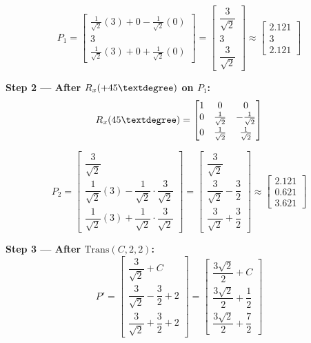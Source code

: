 \documentclass[12pt,a3paper]{article}
\begin{document}
\begin{enumerate}
\begin{tcolorbox}[enhanced,breakable,ansbox,colback=cD!4,colframe=cD,
  boxrule=0.8pt,arc=5pt,
  title={\textbf{Answer}},fonttitle=\bfseries\color{white},colbacktitle=cD]
\[
  P_1 = \begin{bmatrix}
    \frac{1}{\sqrt{2}}(3) + 0 - \frac{1}{\sqrt{2}}(0)\\[4pt]
    3\\[4pt]
    \frac{1}{\sqrt{2}}(3) + 0 + \frac{1}{\sqrt{2}}(0)
  \end{bmatrix}
  = \begin{bmatrix}
    \dfrac{3}{\sqrt{2}}\\[8pt]
    3\\[8pt]
    \dfrac{3}{\sqrt{2}}
  \end{bmatrix}
  \approx \begin{bmatrix}2.121\\3\\2.121\end{bmatrix}
\]

\textbf{Step 2 — After $R_x(+45\textdegree)$ on $P_1$:}
\[
  R_x(45\textdegree) =
  \begin{bmatrix}
    1 & 0 & 0\\
    0 & \frac{1}{\sqrt{2}} & -\frac{1}{\sqrt{2}}\\[4pt]
    0 & \frac{1}{\sqrt{2}} &  \frac{1}{\sqrt{2}}
  \end{bmatrix}
\]

\[
  P_2 = \begin{bmatrix}
    \dfrac{3}{\sqrt{2}}\\[8pt]
    \dfrac{1}{\sqrt{2}}(3) - \dfrac{1}{\sqrt{2}}\!\cdot\!\dfrac{3}{\sqrt{2}}\\[8pt]
    \dfrac{1}{\sqrt{2}}(3) + \dfrac{1}{\sqrt{2}}\!\cdot\!\dfrac{3}{\sqrt{2}}
  \end{bmatrix}
  = \begin{bmatrix}
    \dfrac{3}{\sqrt{2}}\\[8pt]
    \dfrac{3}{\sqrt{2}} - \dfrac{3}{2}\\[8pt]
    \dfrac{3}{\sqrt{2}} + \dfrac{3}{2}
  \end{bmatrix}
  \approx \begin{bmatrix}2.121\\0.621\\3.621\end{bmatrix}
\]

\textbf{Step 3 — After $\mathrm{Trans}(C,2,2)$:}
\[
  P' = \begin{bmatrix}
    \dfrac{3}{\sqrt{2}} + C\\[8pt]
    \dfrac{3}{\sqrt{2}} - \dfrac{3}{2} + 2\\[8pt]
    \dfrac{3}{\sqrt{2}} + \dfrac{3}{2} + 2
  \end{bmatrix}
  = \begin{bmatrix}
    \dfrac{3\sqrt{2}}{2} + C\\[8pt]
    \dfrac{3\sqrt{2}}{2} + \dfrac{1}{2}\\[8pt]
    \dfrac{3\sqrt{2}}{2} + \dfrac{7}{2}
  \end{bmatrix}
\]


\end{tcolorbox}
\end{enumerate}
\end{document}
